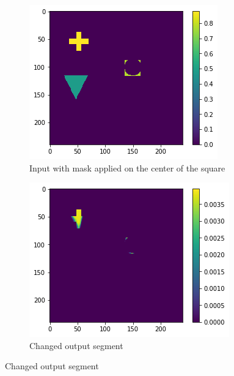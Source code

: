 \begin{figure}[H]
    \centering
    \begin{subfigure}[t]{.33\textwidth}
        \centering
        \includegraphics[width=\linewidth]{chapters/06_hdm/images_analyze/0a_masked.png}
        \caption{Input with mask applied on the center of the square}
    \end{subfigure}%
    \begin{subfigure}[t]{.33\textwidth}
        \centering
        \includegraphics[width=\linewidth]{chapters/06_hdm/images_analyze/0b_segment.png}
        \caption{Changed output segment}
    \end{subfigure}

\end{figure}
